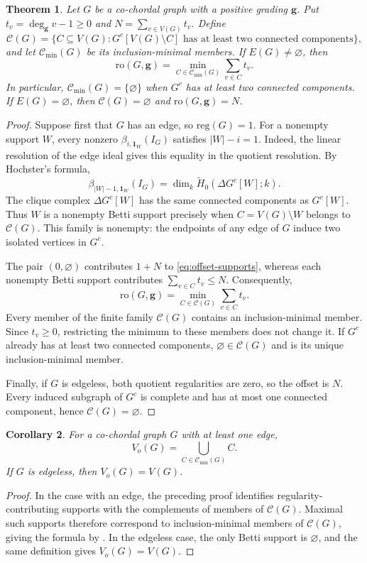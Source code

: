 \documentclass[dvipsnames,10pt]{article}
\newtheorem{theorem}{Theorem}[section]
\newtheorem{cor}[theorem]{Corollary}
\begin{document}
\begin{theorem}
    Let $G$ be a co-chordal graph with a positive grading $\mathbf{g}$. Put $t_v=\deg_{\mathbf{g}}v-1\geq0$ and $N=\sum_{v\in V(G)}t_v$. Define
    \[
        \mathcal{C}(G)=\{C\subseteq V(G):G^c[V(G)\setminus C]
            \text{ has at least two connected components}\},
    \]
    and let $\mathcal{C}_{\min}(G)$ be its inclusion-minimal members. If $E(G)\neq\varnothing$, then
    \[
        \mathrm{ro}(G,\mathbf{g})
          =\min_{C\in\mathcal{C}_{\min}(G)}\sum_{v\in C}t_v.
    \]
    In particular, $\mathcal{C}_{\min}(G)=\{\varnothing\}$ when $G^c$ has at least two connected components. If $E(G)=\varnothing$, then $\mathcal{C}(G)=\varnothing$ and $\mathrm{ro}(G,\mathbf{g})=N$.
\end{theorem}
\begin{proof}
    Suppose first that $G$ has an edge, so $\mathrm{reg}(G)=1$. For a nonempty support $W$, every nonzero $\beta_{i,\mathbf{1}_W}(I_G)$ satisfies $|W|-i=1$. Indeed, the linear resolution of the edge ideal gives this equality in the quotient resolution. By Hochster's formula,
    \[
        \beta_{|W|-1,\mathbf{1}_W}(I_G)
          =\dim_k\widetilde{H}_0(\Delta G^c[W];k).
    \]
    The clique complex $\Delta G^c[W]$ has the same connected components as $G^c[W]$. Thus $W$ is a nonempty Betti support precisely when $C=V(G)\setminus W$ belongs to $\mathcal{C}(G)$. This family is nonempty: the endpoints of any edge of $G$ induce two isolated vertices in $G^c$.

    The pair $(0,\varnothing)$ contributes $1+N$ to \eqref{eq:offset-supports}, whereas each nonempty Betti support contributes $\sum_{v\in C}t_v\leq N$. Consequently,
    \[
        \mathrm{ro}(G,\mathbf{g})
          =\min_{C\in\mathcal{C}(G)}\sum_{v\in C}t_v.
    \]
    Every member of the finite family $\mathcal{C}(G)$ contains an inclusion-minimal member. Since $t_v\geq0$, restricting the minimum to these members does not change it. If $G^c$ already has at least two connected components, $\varnothing\in\mathcal{C}(G)$ and is its unique inclusion-minimal member.

    Finally, if $G$ is edgeless, both quotient regularities are zero, so the offset is $N$. Every induced subgraph of $G^c$ is complete and has at most one connected component, hence $\mathcal{C}(G)=\varnothing$.
\end{proof}
\begin{cor}
    For a co-chordal graph $G$ with at least one edge,
    \[
        V_o(G)=\bigcup_{C\in\mathcal{C}_{\min}(G)}C.
    \]
    If $G$ is edgeless, then $V_o(G)=V(G)$.
\end{cor}
\begin{proof}
    In the case with an edge, the preceding proof identifies regularity-contributing supports with the complements of members of $\mathcal{C}(G)$. Maximal such supports therefore correspond to inclusion-minimal members of $\mathcal{C}(G)$, giving the formula by . In the edgeless case, the only Betti support is $\varnothing$, and the same definition gives $V_o(G)=V(G)$.
\end{proof}
\end{document}
